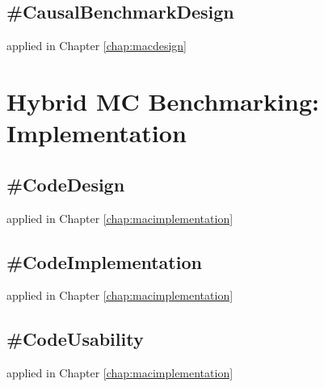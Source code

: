 \documentclass[../main.tex]{subfiles}
\begin{document}

\subsection*{\textbf{\#CausalBenchmarkDesign}}
\label{lo:CausalBenchmarkDesign}

applied in Chapter \ref{chap:macdesign}


\section{Hybrid MC Benchmarking: Implementation}

\subsection*{\textbf{\#CodeDesign}}
\label{lo:CodeDesign}

applied in Chapter \ref{chap:macimplementation}


\subsection*{\textbf{\#CodeImplementation}}
\label{lo:CodeImplementation}

applied in Chapter \ref{chap:macimplementation}


\subsection*{\textbf{\#CodeUsability}}
\label{lo:CodeUsability}

applied in Chapter \ref{chap:macimplementation}

\end{document}
